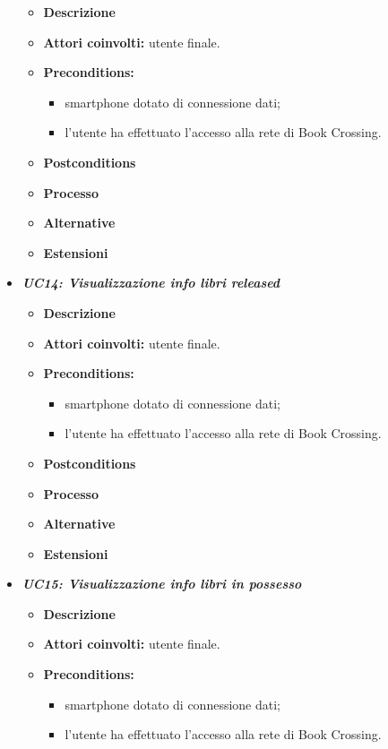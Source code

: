 \begin{itemize}
\begin{itemize}
		\item \textbf{Descrizione}
		\item \textbf{Attori coinvolti:} utente finale.
		\item \textbf{Preconditions:}
		\begin{itemize}
			\item smartphone dotato di connessione dati;
			\item l’utente ha effettuato l’accesso alla rete di Book Crossing.
		\end{itemize}
		\item \textbf{Postconditions}
		\item \textbf{Processo}
		\item \textbf{Alternative}
		\item \textbf{Estensioni}
	\end{itemize}
	\item \textbf{\textit{UC14: Visualizzazione info libri released}}
	\begin{itemize}
		\item \textbf{Descrizione}
		\item \textbf{Attori coinvolti:}  utente finale.
		\item \textbf{Preconditions:}
		\begin{itemize}
			\item smartphone dotato di connessione dati;
			\item l’utente ha effettuato l’accesso alla rete di Book Crossing.
		\end{itemize}
		\item \textbf{Postconditions}
		\item \textbf{Processo}
		\item \textbf{Alternative}
		\item \textbf{Estensioni}
	\end{itemize}
	\item \textbf{\textit{UC15: Visualizzazione info libri in possesso}}
	\begin{itemize}
		\item \textbf{Descrizione}
		\item \textbf{Attori coinvolti:}  utente finale.
		\item \textbf{Preconditions:}
		\begin{itemize}
			\item smartphone dotato di connessione dati;
			\item l’utente ha effettuato l’accesso alla rete di Book Crossing.
		\end{itemize}

\end{itemize}
\end{itemize}
